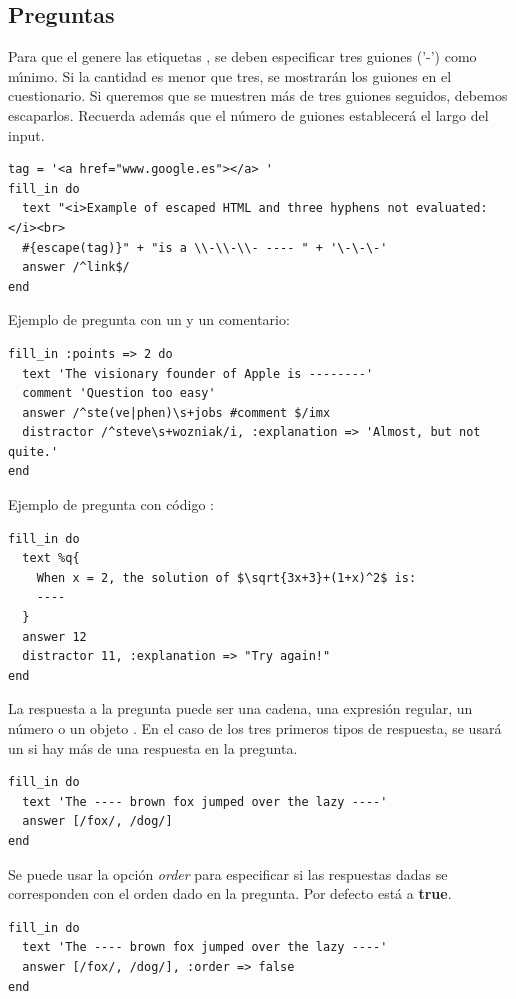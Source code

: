 \subsection{Preguntas }
\label{subsec:Apendice2.1}

Para que el  genere las etiquetas , se deben especificar tres guiones ('-') como m\'{\i}nimo. Si la cantidad es menor que tres, se mostrar\'an los guiones
en el cuestionario. Si queremos que se muestren m\'as de tres guiones seguidos, debemos escaparlos. Recuerda adem\'as que el n\'umero de guiones establecer\'a el largo del input.
\begin{lstlisting}
tag = '<a href="www.google.es"></a> '
fill_in do
  text "<i>Example of escaped HTML and three hyphens not evaluated:</i><br> 
  #{escape(tag)}" + "is a \\-\\-\\- ---- " + '\-\-\-'
  answer /^link$/
end
\end{lstlisting}
\bigskip

Ejemplo de pregunta con un  y un comentario:
\begin{lstlisting}
fill_in :points => 2 do
  text 'The visionary founder of Apple is --------'
  comment 'Question too easy'
  answer /^ste(ve|phen)\s+jobs #comment $/imx
  distractor /^steve\s+wozniak/i, :explanation => 'Almost, but not quite.'
end
\end{lstlisting}
\newpage

Ejemplo de pregunta con c\'odigo :
\begin{lstlisting}
fill_in do
  text %q{
    When x = 2, the solution of $\sqrt{3x+3}+(1+x)^2$ is:
    ----
  }
  answer 12
  distractor 11, :explanation => "Try again!"
end
\end{lstlisting}
\bigskip

La respuesta a la pregunta puede ser una cadena, una expresi\'on regular, un n\'umero o un objeto . En el caso de los tres primeros tipos de respuesta, se usar\'a
un  si hay m\'as de una respuesta en la pregunta.
\begin{lstlisting}
fill_in do
  text 'The ---- brown fox jumped over the lazy ----'
  answer [/fox/, /dog/]
end
\end{lstlisting}
\bigskip

Se puede usar la opci\'on \textit{order} para especificar si las respuestas dadas se corresponden con el orden dado en la pregunta. Por defecto est\'a a {\bfseries true}.
\begin{lstlisting}
fill_in do
  text 'The ---- brown fox jumped over the lazy ----'
  answer [/fox/, /dog/], :order => false
end
\end{lstlisting}

